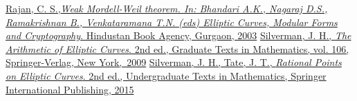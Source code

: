\documentclass[12pt]{article}
\newcommand{\<}{\langle}
\renewcommand{\>}{\rangle}
\numberwithin{equation}{section}
\theoremstyle{plain}
\theoremstyle{definition}
\begin{document}
\begin{thebibliography}{}
\bibitem{}
 \href{http://www.math.tifr.res.in/~rajan/homepage/weakmorweil.pdf}{Rajan, C. S.,\emph{Weak Mordell-Weil theorem. In: Bhandari A.K., Nagaraj D.S., Ramakrishnan B., Venkataramana T.N. (eds) Elliptic Curves, Modular Forms and Cryptography}. Hindustan Book Agency, Gurgaon, 2003}
\bibitem{}
 \href{https://www.springer.com/la/book/9780387094939}{Silverman, J. H.,
 \emph{The Arithmetic of Elliptic Curves}. 2nd ed.,
 Graduate Texts in Mathematics, vol. 106, Springer-Verlag, New York,~2009}
\bibitem{}
 \href{https://books.google.co.kr/books?id=2_PLCQAAQBAJ&printsec=frontcover&dq=Rational+Points+on+Elliptic+Curves&hl=ko&sa=X&ved=0ahUKEwiahcaz_ZDhAhWUxIsBHfEdBtUQ6AEIMTAB#v=onepage&q=Rational%20Points%20on%20Elliptic%20Curves&f=false}{Silverman, J. H., Tate, J. T.,
 \emph{Rational Points on Elliptic Curves}. 2nd ed., Undergraduate Texts in Mathematics, Springer International Publishing, 2015}
\end{thebibliography}
\end{document}
